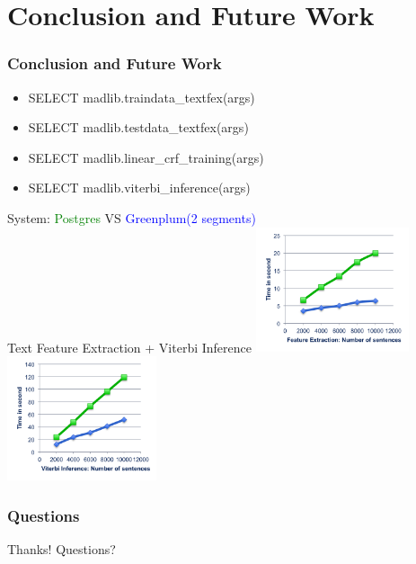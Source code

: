 \documentclass{beamer}
\begin{document}
\section{Conclusion and Future Work}

\begin{frame}
  \frametitle{Conclusion and Future Work}

  \begin{itemize}
    \item SELECT madlib.traindata\_textfex(args)
    \item SELECT madlib.testdata\_textfex(args)
    \item SELECT madlib.linear\_crf\_training(args)
    \item SELECT madlib.viterbi\_inference(args)
  \end{itemize}
  System: \textcolor{green}{Postgres} VS \textcolor{blue}{Greenplum(2 segments)}\\
	  Text Feature Extraction + Viterbi Inference
	  \includegraphics[height=9.9em]{extraction.png}
	  \includegraphics[height=9.9em]{viterbi.png}
\end{frame}

\begin{frame}
  \frametitle{Questions}
  \begin{center}
   Thanks! Questions?
  \end{center}
\end{frame}
\end{document}
